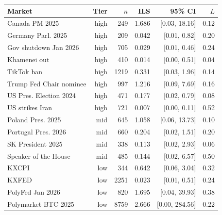 \begin{tabular}{lrrrrr}
\toprule
Market & Tier & $n$ & ILS & 95\% CI & $L$ \\
\midrule
Canada PM 2025 & high & 249 & 1.686 & [0.03, 18.16] & 0.12 \\
Germany Parl. 2025 & high & 209 & 0.042 & [0.01, 0.82] & 0.20 \\
Gov shutdown Jan 2026 & high & 705 & 0.029 & [0.01, 0.46] & 0.24 \\
Khamenei out & high & 410 & 0.014 & [0.00, 0.51] & 0.04 \\
TikTok ban & high & 1219 & 0.331 & [0.03, 1.96] & 0.14 \\
Trump Fed Chair nominee & high & 997 & 1.216 & [0.09, 7.69] & 0.16 \\
US Pres. Election 2024 & high & 471 & 0.177 & [0.02, 0.79] & 0.08 \\
US strikes Iran & high & 721 & 0.007 & [0.00, 0.11] & 0.52 \\
Poland Pres. 2025 & mid & 645 & 1.058 & [0.06, 13.73] & 0.10 \\
Portugal Pres. 2026 & mid & 660 & 0.204 & [0.02, 1.51] & 0.20 \\
SK President 2025 & mid & 338 & 0.113 & [0.02, 2.93] & 0.06 \\
Speaker of the House & mid & 485 & 0.144 & [0.02, 6.57] & 0.50 \\
KXCPI & low & 344 & 0.642 & [0.06, 3.04] & 0.32 \\
KXFED & low & 2251 & 0.023 & [0.01, 0.51] & 0.24 \\
PolyFed Jan 2026 & low & 820 & 1.695 & [0.04, 39.93] & 0.38 \\
Polymarket BTC 2025 & low & 8759 & 2.666 & [0.00, 284.56] & 0.22 \\
\bottomrule
\end{tabular}